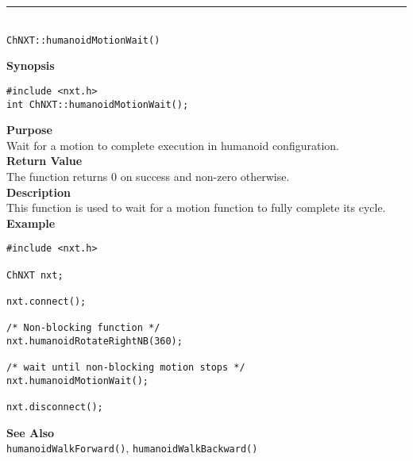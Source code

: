 \noindent
\vspace{5pt}
\rule{4.5in}{0.015in}\\
\noindent
{\LARGE \texttt{ChNXT::humanoidMotionWait()}}\\
{}

\noindent
{\bf Synopsis}
\vspace{-8pt}
\begin{verbatim}
#include <nxt.h>
int ChNXT::humanoidMotionWait();
\end{verbatim}

\noindent
{\bf Purpose}\\
Wait for a motion to complete execution in humanoid configuration.\\

\noindent
{\bf Return Value}\\
The function returns 0 on success and non-zero otherwise.\\

\noindent
{\bf Description}\\
This function is used to wait for a motion function to fully complete its cycle.\\


\noindent
{\bf Example}\\
\begin{verbatim}
#include <nxt.h>

ChNXT nxt;

nxt.connect();

/* Non-blocking function */
nxt.humanoidRotateRightNB(360);

/* wait until non-blocking motion stops */
nxt.humanoidMotionWait();

nxt.disconnect();
\end{verbatim}

\noindent
{\bf See Also}\\
\texttt{humanoidWalkForward()}, \texttt{humanoidWalkBackward()}




